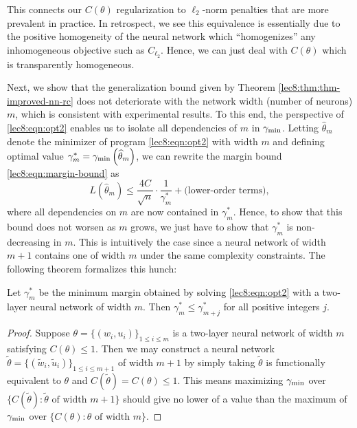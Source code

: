 This connects our $C(\theta)$ regularization to $\ell_2$-norm penalties that are more prevalent in practice. In retrospect, we see this equivalence is essentially due to the positive homogeneity of the neural network which ``homogenizes'' any inhomogeneous objective such as $C_{\ell_2}$. Hence, we can just deal with $C(\theta)$ which is transparently homogeneous.


Next, we show that the generalization bound given by Theorem \ref{lec8:thm:thm-improved-nn-rc} does not deteriorate with the network width (number of neurons) $m$, which is consistent with experimental results. To this end, the perspective of \eqref{lec8:eqn:opt2} enables us to isolate all dependencies of $m$ in $\gamma_{\mathrm{min}}$. Letting $\widehat \theta_m$ denote the minimizer of program \eqref{lec8:eqn:opt2} with width $m$ and defining optimal value $\gamma_m^* = \gamma_{\mathrm{min}}\left(\widehat \theta_m\right)$, we can rewrite the margin bound \eqref{lec8:eqn:margin-bound} as 
\begin{equation}
L(\widehat \theta_m) \le \frac{4C}{\sqrt{n}} \cdot \frac{1}{\gamma_m^*} + \text{(lower-order terms)},
\end{equation}
where all dependencies on $m$ are now contained in $\gamma_m^*$. Hence, to show that this bound does not worsen as $m$ grows, we just have to show that $\gamma_m^*$ is non-decreasing in $m$. This is intuitively the case since a neural network of width $m+1$ contains one of width $m$ under the same complexity constraints. The following theorem formalizes this hunch:

\begin{theorem}
Let $\gamma_m^*$ be the minimum margin obtained by solving \eqref{lec8:eqn:opt2} with a two-layer neural network of width $m$. Then $\gamma_m^* \leq \gamma_{m+j}^*$ for all positive integers $j$.
\end{theorem}

\begin{proof}
Suppose $\theta = \{(w_i, u_i)\}_{1 \leq i \leq m}$ is a two-layer neural network of width $m$ satisfying $C(\theta)\le 1$. Then we may construct a neural network $\widetilde \theta = \{(\tilde w_i, \tilde u_i)\}_{1 \leq i \leq m+1}$ of width $m+1$ by simply taking
$\widetilde \theta$ is functionally equivalent to $\theta$ and $C(\widetilde \theta) = C(\theta) \le 1$. This means maximizing $\gamma_{\mathrm{min}}$ over $\{C(\widetilde \theta): \widetilde \theta\text{ of width }m+1\}$ should give no lower of a value than the maximum of $\gamma_{\mathrm{min}}$ over $\{C(\theta): \theta\text{ of width }m\}$.
\end{proof}

